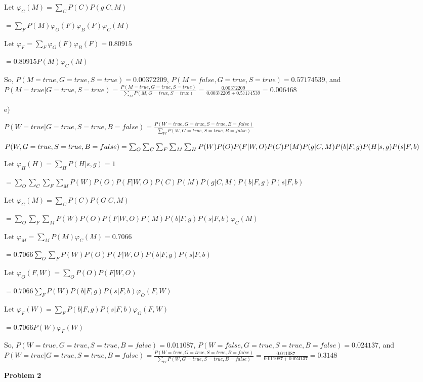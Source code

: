 \documentclass[12pt]{article}
\begin{document}
Let $\varphi_C(M) = \sum_C P(C)P(g \vert C, M)$

$= \sum_F P(M)\varphi_O(F)\varphi_B(F)\varphi_C(M)$

Let $\varphi_F = \sum_F \varphi_O(F)\varphi_B(F) = 0.80915$

$= 0.80915P(M)\varphi_C(M)$

So, $P(M = true, G = true, S = true) = 0.00372209$, $P(M = false, G = true, S = true) = 0.57174539$, and $P(M = true \vert G = true, S = true) = \frac{P(M = true, G = true, S = true)}{\sum_M P(M, G = true, S = true)} = \frac{0.00372209}{0.00372209 + 0.57174539} = \mathbf{0.006468}$

e) 

$P(W = true \vert G = true, S = true, B = false) = \frac{P(W = true, G = true, S = true, B = false)}{\sum_W P(W, G = true, S = true, B = false)}$

$P(W, G = true, S = true, B = false) = \sum_O\sum_C\sum_F\sum_M\sum_H P(W)P(O)P(F\vert W, O)P(C)P(M)\\P(g \vert C, M)P(b \vert F, g)P(H \vert s, g)P(s \vert F, b)$

Let $\varphi_H(H) = \sum_H P(H \vert s, g) = 1$

$= \sum_O\sum_C\sum_F\sum_M P(W)P(O)P(F\vert W, O)P(C)P(M)P(g \vert C, M)P(b \vert F, g)P(s \vert F, b)$

Let $\varphi_C(M) = \sum_C P(C)P(G \vert C, M)$

$= \sum_O\sum_F\sum_M P(W)P(O)P(F\vert W, O)P(M)P(b \vert F, g)P(s \vert F, b)\varphi_C(M)$

Let $\varphi_M = \sum_M P(M)\varphi_C(M) = 0.7066$

$= 0.7066\sum_O\sum_F P(W)P(O)P(F\vert W, O)P(b \vert F, g)P(s \vert F, b)$

Let $\varphi_O(F, W) = \sum_O P(O)P(F \vert W, O)$

$= 0.7066\sum_F P(W)P(b \vert F, g)P(s \vert F, b)\varphi_O(F, W)$

Let $\varphi_F(W) = \sum_F P(b \vert F, g)P(s \vert F, b)\varphi_O(F, W)$

$= 0.7066P(W)\varphi_F(W)$

So, $P(W = true, G = true, S = true, B = false) = 0.011087$, $P(W = false, G = true, S = true, B = false) = 0.024137$, and $P(W = true \vert G = true, S = true, B = false) = \frac{P(W = true, G = true, S = true, B = false)}{\sum_W P(W, G = true, S = true, B = false)} = \frac{0.011087}{0.011087 + 0.024137} = \mathbf{0.3148}$

\pagebreak\textbf{Problem 2}
\end{document}
